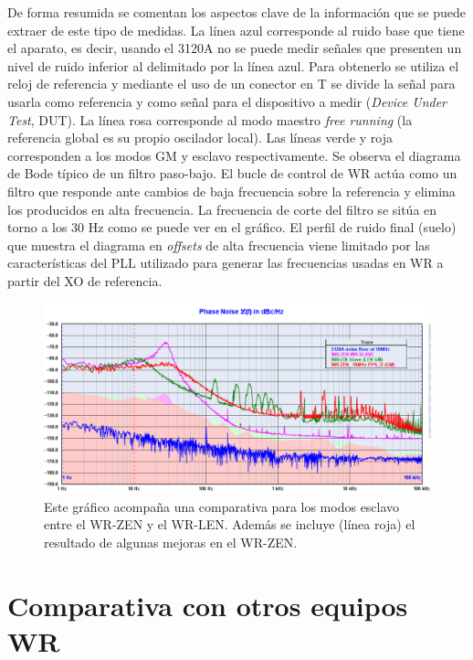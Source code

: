 De forma resumida se comentan los aspectos clave de la información que se puede 
extraer de este tipo de medidas. La línea azul corresponde al ruido base que 
tiene el aparato, es decir, usando el 3120A no se puede medir señales que 
presenten un nivel de ruido inferior al delimitado por la línea azul. Para 
obtenerlo se utiliza el reloj de referencia y mediante el uso de un conector en 
T se divide la señal para usarla como referencia y como señal para el 
dispositivo a medir (\textit{Device Under Test}, DUT). La línea rosa 
corresponde al modo maestro \textit{free running} (la referencia global es su 
propio oscilador local). Las líneas verde y roja corresponden a los modos GM y 
esclavo respectivamente. Se observa el diagrama de Bode típico de un filtro 
paso-bajo. El bucle de control de WR actúa como un filtro que responde ante 
cambios de baja frecuencia sobre la referencia y elimina los producidos en alta 
frecuencia. La frecuencia de corte del filtro se sitúa en torno a los 30 Hz 
como se puede ver en el gráfico. El perfil de ruido final (suelo) que muestra 
el diagrama en \textit{offsets} de alta frecuencia viene limitado por las 
características del PLL utilizado para generar las frecuencias usadas en WR a 
partir del XO de referencia.

\begin{figure}
	\centering
	\includegraphics[width=\linewidth]{imagenes/zen_len_comp}
	\caption[Comparativa de \textit{Phase Noise} entre WR-ZEN y WR-LEN]{Este 
		gráfico acompaña una comparativa para los modos esclavo entre el WR-ZEN 
		y 
		el WR-LEN. Además se incluye (línea roja) el resultado de algunas 
		mejoras 
		en el WR-ZEN.}
	\label{fig:zenlencomp}
\end{figure}

\section{Comparativa con otros equipos WR}

